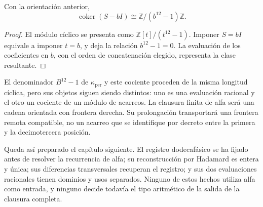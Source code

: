 \begin{proposition}
\label{x_reciprocidad:prop:k-cociente-acarreo}
Con la orientación anterior,
\[
 \operatorname{coker}(S-bI)\cong\mathbb Z/(b^{12}-1)\mathbb Z.
\]
\end{proposition}

\begin{proof}
El módulo cíclico se presenta como
\(\mathbb Z[t]/(t^{12}-1)\). Imponer \(S=bI\) equivale a imponer
\(t=b\), y deja la relación \(b^{12}-1=0\). La evaluación de los
coeficientes en \(b\), con el orden de concatenación elegido, representa
la clase resultante.
\end{proof}

El denominador \(B^{12}-1\) de \(\kappa_{\mathrm{per}}\) y este
cociente proceden de la misma longitud cíclica, pero sus objetos siguen
siendo distintos: uno es una evaluación racional y el otro un cociente
de un módulo de acarreos. La clausura finita de alfa será una cadena
orientada con frontera derecha. Su prolongación transportará una
frontera remota compatible, no un acarreo que se identifique por decreto
entre la primera y la decimotercera posición.

Queda así preparado el capítulo siguiente. El registro dodecafásico se ha fijado antes
de resolver la recurrencia de alfa; su reconstrucción por Hadamard es
entera y única; sus diferencias transversales recuperan el registro; y
sus dos evaluaciones racionales tienen dominios y usos separados. Ninguno
de estos hechos utiliza alfa como entrada, y ninguno decide todavía el
tipo aritmético de la salida de la clausura completa.
